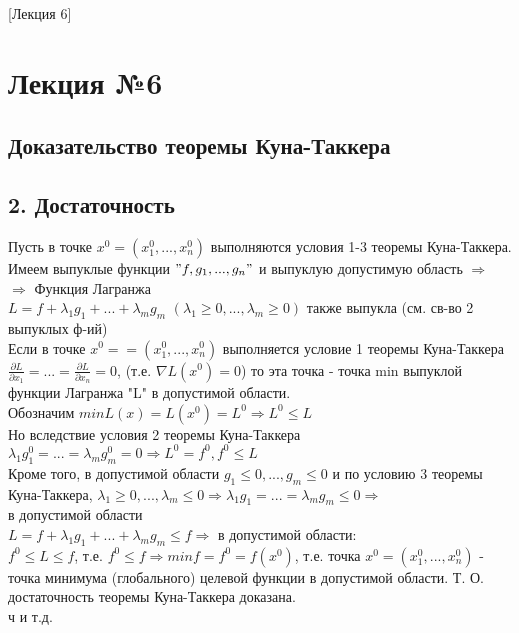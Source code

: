 [Лекция 6]

\newpage

\section*{Лекция №6}
\subsection*{Доказательство теоремы Куна-Таккера}
\subsection*{2. Достаточность}
Пусть в точке $x^0 = (x_1^0, ..., x_n^0)$ выполняются условия 1-3 теоремы Куна-Таккера. \\
Имеем выпуклые функции $"f, g_1, ..., g_n"$ и выпуклую допустимую область $\Rightarrow$ \\
$\Rightarrow$ Функция Лагранжа \\
$L = f + \lambda_1g_1 + ... + \lambda_m g_m$ $(\lambda_1 \geqslant 0, ..., \lambda_m \geqslant 0)$ также выпукла (см. св-во 2 выпуклых ф-ий) \\
Если в точке $x^0 = = (x_1^0, ..., x_n^0)$ выполняется условие 1 теоремы Куна-Таккера
$\frac{\partial L}{\partial x_1} = ... = \frac{\partial L}{\partial x_n} = 0$, (т.е. $\nabla L (x^0) = 0$) то эта точка - точка min выпуклой функции Лагранжа "L" в допустимой области. \\
Обозначим $min L(x) = L (x^0) = L^0 \Rightarrow L^0 \leqslant L$ \\
Но вследствие условия 2 теоремы Куна-Таккера \\
$\lambda_1 g_1^0 = ... = \lambda_m g_m^0 = 0 \Rightarrow L^0 = f^0, f^0 \leqslant L$ \\
Кроме того, в допустимой области $g_1 \leqslant 0, ..., g_m \leqslant 0$ и по условию 3 теоремы Куна-Таккера, $\lambda_1 \geqslant 0, ..., \lambda_m \leqslant 0 \Rightarrow \lambda_1 g_1 = ... = \lambda_m g_m \leqslant 0 \Rightarrow$ \\
в допустимой области \\
$L = f + \lambda_1 g_1 + ... + \lambda_m g_m \leqslant f \Rightarrow$ в допустимой области: \\
$f^0 \leqslant L \leqslant f$, т.е. $f^0 \leqslant f \Rightarrow min f = f^0 = f(x^0)$, т.е. точка $x^0 = (x_1^0, ..., x_n^0)$
- точка минимума (глобального) целевой функции в допустимой области. 
Т. О. достаточность теоремы Куна-Таккера доказана. \\
ч и т.д. 
